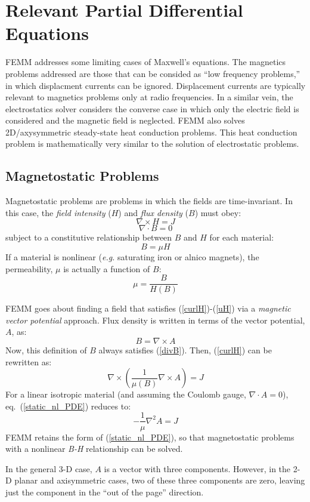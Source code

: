 \documentclass[12pt]{report}
\newcommand{\be}{\begin{equation}}
\newcommand{\ee}{\end{equation}}
\newcommand{\Curl}{\nabla \times}
\newcommand{\Div}{\nabla \cdot}
\begin{document}
\section{Relevant Partial Differential Equations}

FEMM addresses some limiting cases of Maxwell's equations.  The
magnetics problems addressed are those that can be consided as
``low frequency problems,'' in which displacment currents can be
ignored. Displacement currents are typically relevant to magnetics
problems only at radio frequencies.  In a similar vein, the
electrostatics solver considers the converse case in which only the
electric field is considered and the magnetic field is neglected.
FEMM also solves 2D/axysymmetric steady-state heat conduction problems.
This heat conduction problem is mathematically very similar to the
solution of electrostatic problems.

\subsection{Magnetostatic Problems}

Magnetostatic problems are problems in which the fields are
time-invariant.  In this case, the {\em field intensity} ($H$) and
{\em flux density} ($B$) must obey:
\be \label{curlH} \Curl H = J \ee
\be \label{divB} \Div B = 0 \ee
subject to a constitutive relationship between $B$ and $H$ for each
material:
\be \label{uH} B= \mu H \ee
If a material is nonlinear ({\em e.g.} saturating iron or alnico
magnets), the permeability, $\mu$ is actually a function of $B$:
\be \mu= \frac{B}{H(B)} \ee

FEMM goes about finding a field that satisfies
(\ref{curlH})-(\ref{uH}) via a {\em magnetic vector potential}
approach. Flux density is written in terms of the vector potential,
$A$, as:
\be \label{defA} B = \Curl A \ee
Now, this definition of $B$ always satisfies (\ref{divB}).  Then,
(\ref{curlH}) can be rewritten as:
\be \label{static_nl_PDE} \nabla \times \left( \frac{1}{\mu(B)} \nabla \times A \right) = J \ee
For a linear isotropic material (and assuming the Coulomb gauge, $\nabla \cdot A =0$), eq.~(\ref{static_nl_PDE}) reduces to:
\be \label{static_lin_PDE} -\frac{1}{\mu} \nabla^2 A = J \ee
FEMM retains the form of (\ref{static_nl_PDE}), so that
magnetostatic problems with a nonlinear {\em B-H} relationship can
be solved.

In the general 3-D case, $A$ is a vector with three components.
However, in the 2-D planar and axisymmetric cases, two of these
three components are zero, leaving just the component in the ``out
of the page'' direction.
\end{document}
